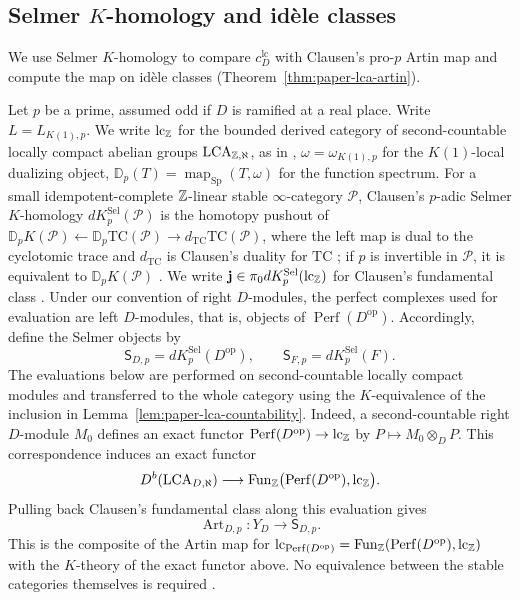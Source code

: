 \subsection{Selmer \texorpdfstring{$K$}{K}-homology and id\`ele classes}\label{subsec:paper-lca-selmer}
We use Selmer $K$-homology to compare $c^{\mathrm{lc}}_D$ with Clausen's pro-$p$ Artin map and compute the map on id\`ele classes (Theorem~\ref{thm:paper-lca-artin}).

Let $p$ be a prime, assumed odd if $D$ is ramified at a real place.
Write $L=L_{K(1),p}$.
We write $\mathrm{lc}_\mathbb Z$ for the bounded derived category of second-countable locally compact abelian groups $\operatorname{LCA}_{\mathbb Z,\aleph}$, as in \cite[Definitions 0.2 and 3.2]{ClausenArtin}, $\omega=\omega_{K(1),p}$ for the $K(1)$-local dualizing object, $\mathbb D_p(T)=\operatorname{map}_{\mathrm{Sp}}(T,\omega)$ for the function spectrum.
For a small idempotent-complete $\mathbb Z$-linear stable $\infty$-category $\mathcal P$, Clausen's $p$-adic Selmer $K$-homology $dK^{\mathrm{Sel}}_p(\mathcal P)$ is the homotopy pushout of $\mathbb D_pK(\mathcal P)\leftarrow\mathbb D_p\mathrm{TC}(\mathcal P)\to d_{\mathrm{TC}}\mathrm{TC}(\mathcal P)$, where the left map is dual to the cyclotomic trace and $d_{\mathrm{TC}}$ is Clausen's duality for $\mathrm{TC}$ \cite[Definition 2.1]{ClausenArtin}; if $p$ is invertible in $\mathcal P$, it is equivalent to $\mathbb D_pK(\mathcal P)$ \cite[Proposition 2.11(1)]{ClausenArtin}.
We write $\mathbf j\in\pi_0dK^{\mathrm{Sel}}_p(\mathrm{lc}_\mathbb Z)$ for Clausen's fundamental class \cite[Definitions 1.4 and 4.2]{ClausenArtin}.
Under our convention of right $D$-modules, the perfect complexes used for evaluation are left $D$-modules, that is, objects of $\operatorname{Perf}(D^{\mathrm{op}})$.
Accordingly, define the Selmer objects by
\[
 \mathsf S_{D,p}=dK^{\mathrm{Sel}}_p(D^{\mathrm{op}}),
 \qquad
 \mathsf S_{F,p}=dK^{\mathrm{Sel}}_p(F).
\]
The evaluations below are performed on second-countable locally compact modules and transferred to the whole category using the $K$-equivalence of the inclusion in Lemma~\ref{lem:paper-lca-countability}.
Indeed, a second-countable right $D$-module $M_0$ defines an exact functor $\operatorname{Perf}(D^{\mathrm{op}})\to\mathrm{lc}_{\mathbb Z}$ by $P\mapsto M_0\otimes_D P$.
This correspondence induces an exact functor
\[
 D^b(\operatorname{LCA}_{D,\aleph})\longrightarrow
 \operatorname{Fun}_{\mathbb Z}
 \bigl(\operatorname{Perf}(D^{\mathrm{op}}),\mathrm{lc}_{\mathbb Z}\bigr).
\]
Pulling back Clausen's fundamental class along this evaluation gives
\[
 \operatorname{Art}_{D,p}\colon Y_D\longrightarrow\mathsf S_{D,p}.
\]
This is the composite of the Artin map for $\mathrm{lc}_{\operatorname{Perf}(D^{\mathrm{op}})}=\operatorname{Fun}_{\mathbb Z}(\operatorname{Perf}(D^{\mathrm{op}}),\mathrm{lc}_{\mathbb Z})$ with the $K$-theory of the exact functor above.
No equivalence between the stable categories themselves is required \cite[Definitions 3.2 and 4.2, Remarks 4.3--4.4]{ClausenArtin}.

